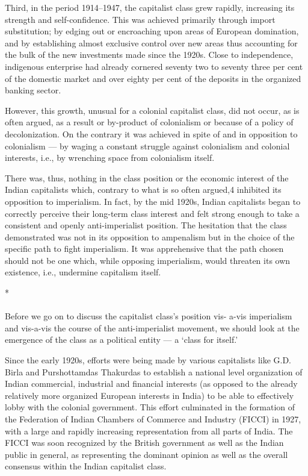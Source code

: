 Third, in the period 1914--1947, the capitalist class grew rapidly, increasing its strength and self-confidence. This was achieved primarily through import substitution; by edging out or encroaching upon areas of European domination, and by establishing almost exclusive control over new areas thus accounting for the bulk of the new investments made since the 1920s. Close to independence, indigenous enterprise had already cornered seventy two to seventy three per cent of the domestic market and over eighty per cent of the deposits in the organized banking sector. 

However, this growth, unusual for a colonial capitalist class, did not occur, as is often argued, as a result or by-product of colonialism or because of a policy of decolonization. On the contrary it was achieved in spite of and in opposition to colonialism --- by waging a constant struggle against colonialism and colonial interests, i.e., by wrenching space from colonialism itself. 

There was, thus, nothing in the class position or the economic interest of the Indian capitalists which, contrary to what is so often argued,4 inhibited its opposition to imperialism. In fact, by the mid 1920s, Indian capitalists began to correctly perceive their long-term class interest and felt strong enough to take a consistent and openly anti-imperialist position. The hesitation that the class demonstrated was not in its opposition to ampenalism but in the choice of the specific path to fight imperialism. It was apprehensive that the path chosen should not be one which, while opposing imperialism, would threaten its own existence, i.e., undermine capitalism itself.

\begin{center}*\end{center}

\paragraph*{}
Before we go on to discuss the capitalist class's position vis- a-vis imperialism and vis-a-vis the course of the anti-imperialist movement, we should look at the emergence of the class as a political entity --- a `class for itself.' 

Since the early 1920s, efforts were being made by various capitalists like G.D. Birla and Purshottamdas Thakurdas to establish a national level organization of Indian commercial, industrial and financial interests (as opposed to the already relatively more organized European interests in India) to be able to effectively lobby with the colonial government. This effort culminated in the formation of the Federation of Indian Chambers of Commerce and Industry (FICCI) in 1927, with a large and rapidly increasing representation from all parts of India. The FICCI was soon recognized by the British government as well as the Indian public in general, as representing the dominant opinion as well as the overall consensus within the Indian capitalist class. 


